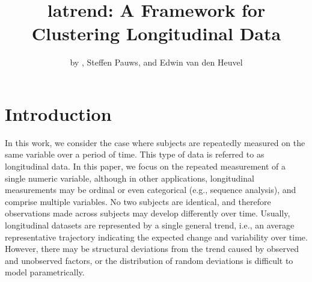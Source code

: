 \title{latrend: A Framework for Clustering Longitudinal Data}


\author{by , Steffen Pauws, and Edwin van den Heuvel}

\maketitle


\section{Introduction}\label{sec:intro}

In this work, we consider the case where subjects are repeatedly measured on the same variable over a period of time. This type of data is referred to as longitudinal data. In this paper, we focus on the repeated measurement of a single numeric variable, although in other applications, longitudinal measurements may be ordinal or even categorical (e.g., sequence analysis), and comprise multiple variables. No two subjects are identical, and therefore observations made across subjects may develop differently over time. Usually, longitudinal datasets are represented by a single general trend, i.e., an average representative trajectory indicating the expected change and variability over time. However, there may be structural deviations from the trend caused by observed and unobserved factors, or the distribution of random deviations is difficult to model parametrically.

